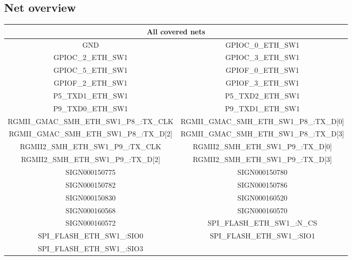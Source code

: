 \subsection{Net overview}
 \begin{center} 
  \begin{longtable}{|c|c|} 
   \hline 
    \multicolumn{2}{|c|}{All covered nets}\\ 
   \hline 
    GND & GPIOC\_0\_ETH\_SW1 \\ \hline 
    GPIOC\_2\_ETH\_SW1 & GPIOC\_3\_ETH\_SW1 \\ \hline 
    GPIOC\_5\_ETH\_SW1 & GPIOF\_0\_ETH\_SW1 \\ \hline 
    GPIOF\_2\_ETH\_SW1 & GPIOF\_3\_ETH\_SW1 \\ \hline 
    P5\_TXD1\_ETH\_SW1 & P5\_TXD2\_ETH\_SW1 \\ \hline 
    P9\_TXD0\_ETH\_SW1 & P9\_TXD1\_ETH\_SW1 \\ \hline 
    RGMII\_GMAC\_SMH\_ETH\_SW1\_P8\_:TX\_CLK & RGMII\_GMAC\_SMH\_ETH\_SW1\_P8\_:TX\_D[0] \\ \hline 
    RGMII\_GMAC\_SMH\_ETH\_SW1\_P8\_:TX\_D[2] & RGMII\_GMAC\_SMH\_ETH\_SW1\_P8\_:TX\_D[3] \\ \hline 
    RGMII2\_SMH\_ETH\_SW1\_P9\_:TX\_CLK & RGMII2\_SMH\_ETH\_SW1\_P9\_:TX\_D[0] \\ \hline 
    RGMII2\_SMH\_ETH\_SW1\_P9\_:TX\_D[2] & RGMII2\_SMH\_ETH\_SW1\_P9\_:TX\_D[3] \\ \hline 
    SIGN000150775 & SIGN000150780 \\ \hline 
    SIGN000150782 & SIGN000150786 \\ \hline 
    SIGN000150830 & SIGN000160520 \\ \hline 
    SIGN000160568 & SIGN000160570 \\ \hline 
    SIGN000160572 & SPI\_FLASH\_ETH\_SW1\_:N\_CS \\ \hline 
    SPI\_FLASH\_ETH\_SW1\_:SIO0 & SPI\_FLASH\_ETH\_SW1\_:SIO1 \\ \hline 
    SPI\_FLASH\_ETH\_SW1\_:SIO3 &  \\ \hline 
  \end{longtable} 
 \end{center}
